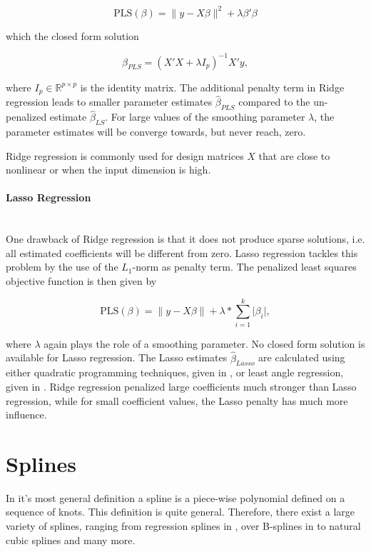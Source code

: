 \documentclass[10pt,a4paper]{article}
\newcommand{\subsubsubsection}[1]{\paragraph{#1}\mbox{}\\}
\begin{document}
$$\text{PLS}(\beta) = \lVert y - X\beta\rVert^2 + \lambda \beta'\beta$$

which the closed form solution 

$$\hat\beta_{PLS} = (X'X + \lambda I_p)^{-1}X'y,$$

where $I_p \in \mathbb R^{p \times p}$ is the identity matrix. The additional penalty term in Ridge regression leads to smaller parameter estimates $\hat \beta_{PLS}$ compared to the un-penalized estimate $\hat \beta_{LS}$. For large values of the smoothing parameter $\lambda$, the parameter estimates will be converge towards, but never reach, zero. 

Ridge regression is commonly used for design matrices $X$ that are close to nonlinear or when the input dimension is high. \cite{hoerl1970ridge}

\subsubsubsection{Lasso Regression}

One drawback of Ridge regression is that it does not produce sparse solutions, i.e. all estimated coefficients will be different from zero. Lasso regression tackles this problem by the use of the $L_1$-norm as penalty term. The penalized least squares objective function is then given by

$$\text{PLS}(\beta) = \lVert y - X\beta \rVert + \lambda*\sum_{i=1}^k\vert \beta_i\vert,$$

where $\lambda$ again plays the role of a smoothing parameter. No closed form solution is available for Lasso regression. The Lasso estimates  $\hat \beta_{Lasso}$ are calculated using either quadratic programming techniques, given in \cite{tibshirani1996lasso}, or least angle regression, given in \cite{efron2004leastangleregression}. Ridge regression penalized large coefficients much stronger than Lasso regression, while for small coefficient values, the Lasso penalty has much more influence. \cite{tibshirani1996lasso}


\section{Splines} \label{SectionSplines}
	
In it's most general definition a spline is a piece-wise polynomial defined on a sequence of knots. This definition is quite general. Therefore, there exist a large variety of splines, ranging from regression splines in \cite{eubank1990regressionsplines}, over B-splines in \cite{deBoor1978practicalGuideToSplines} to natural cubic splines and many more.
\end{document}
